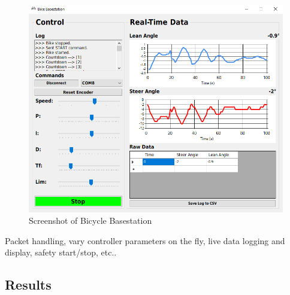 \begin{figure}[h]
\centering
\includegraphics[scale=0.5]{Basestation}
\caption{Screenshot of Bicycle Basestation}
\label{fig:basestation}
\end{figure}

Packet handling, vary controller parameters on the fly, live data logging and display, safety start/stop, etc..

\subsection{Results}